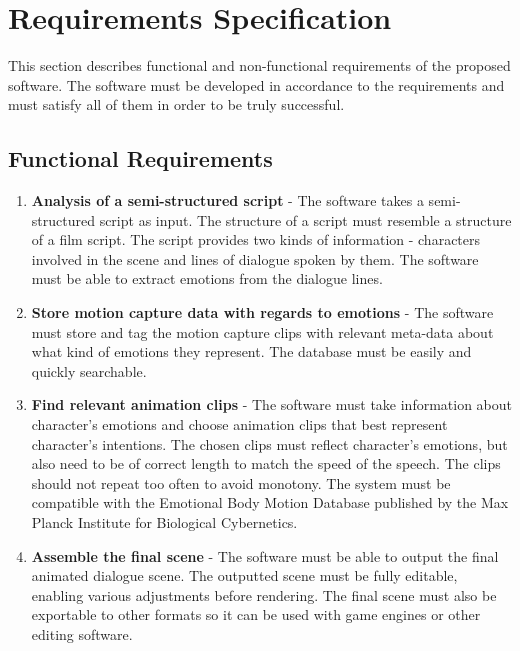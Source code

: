 \chapter{Requirements Specification\label{chap:requirements}}

\noindent This section describes functional and non-functional requirements of the proposed software. The software must be developed in accordance to the requirements and must satisfy all of them in order to be truly successful.


\section{Functional Requirements}

\begin{enumerate}

\item {\bf Analysis of a semi-structured script} - The software takes a semi-structured script as input. The structure of a script must resemble a structure of a film script. The script provides two kinds of information - characters involved in the scene and lines of dialogue spoken by them. The software must be able to extract emotions from the dialogue lines.

\item {\bf Store motion capture data with regards to emotions} - The software must store and tag the motion capture clips with relevant meta-data about what kind of emotions they represent. The database must be easily and quickly searchable.

\item {\bf Find relevant animation clips} - The software must take information about character's emotions and choose animation clips that best represent character's intentions. The chosen clips must reflect character's emotions, but also need to be of correct length to match the speed of the speech. The clips should not repeat too often to avoid monotony. The system must be compatible with the Emotional Body Motion Database published by the Max Planck Institute for Biological Cybernetics.

\item {\bf Assemble the final scene} -  The software must be able to output the final animated dialogue scene. The outputted scene must be fully editable, enabling various adjustments before rendering. The final scene must also be exportable to other formats so it can be used with game engines or other editing software.

\end{enumerate}


